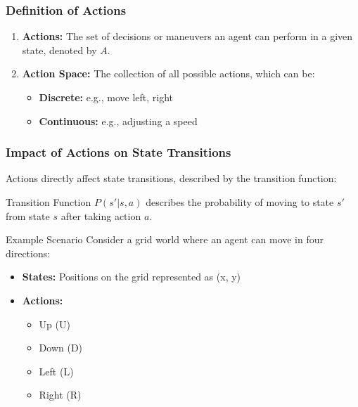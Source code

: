 \documentclass[aspectratio=169]{beamer}
\begin{document}
\begin{frame}[fragile]
    \frametitle{Definition of Actions}
    
    \begin{enumerate}
        \item \textbf{Actions:} The set of decisions or maneuvers an agent can perform in a given state, denoted by \( A \).
        \item \textbf{Action Space:} The collection of all possible actions, which can be:
            \begin{itemize}
                \item \textbf{Discrete:} e.g., move left, right
                \item \textbf{Continuous:} e.g., adjusting a speed
            \end{itemize}
    \end{enumerate}
\end{frame}

\begin{frame}[fragile]
    \frametitle{Impact of Actions on State Transitions}
    
    Actions directly affect state transitions, described by the transition function:
    
    \begin{block}{Transition Function}
        \( P(s' | s, a) \) describes the probability of moving to state \( s' \) from state \( s \) after taking action \( a \).
    \end{block}

    \begin{block}{Example Scenario}
        Consider a grid world where an agent can move in four directions:
        \begin{itemize}
            \item \textbf{States:} Positions on the grid represented as (x, y)
            \item \textbf{Actions:} 
                \begin{itemize}
                    \item Up (U)
                    \item Down (D)
                    \item Left (L)
                    \item Right (R)
                \end{itemize}
        \end{itemize}
    \end{block}
\end{frame}
\end{document}
